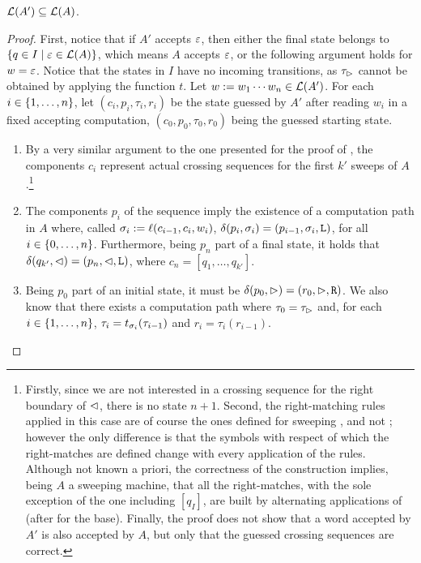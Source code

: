 \begin{lemm}\label{lem:swkLAtoNFA-2}
	$\mathcal L(A')\subseteq\mathcal L(A)$.
\end{lemm}
\begin{proof}
	First, notice that if $A'$ accepts $\varepsilon$, then either the final state belongs to $\{q\in I\mid \varepsilon\in\mathcal L(A)\}$, which means $A$ accepts $\varepsilon$, or the following argument holds for $w=\varepsilon$.
	Notice that the states in $I$ have no incoming transitions, as $\tau_\rhd$ cannot be obtained by applying the function $t$.
	Let $w:=w_1\cdots w_n\in\mathcal L(A')$. For each $i\in\{1,\dots,n\}$, let $(c_i,p_i,\tau_i,r_i)$ be the state guessed by $A'$ after reading $w_i$ in a fixed accepting computation, $(c_0,p_0,\tau_0,r_0)$ being the guessed starting state.
	\begin{enumerate}
		\item By a very similar argument to the one presented for the proof of , the components $c_i$ represent actual crossing sequences for the first $k'$ sweeps of $A$.\footnote{%
			      Firstly, since we are not interested in a crossing sequence for the right boundary of $\lhd$, there is no state $n+1$.
			      Second, the right-matching rules applied in this case are of course the ones defined for sweeping \kDLAs, and not \TDFAs; however the only difference is that the symbols with respect of which the right-matches are defined change with every application of the rules.
			      Although not known a priori, the correctness of the construction implies, being $A$ a sweeping machine, that all the right-matches, with the sole exception of the one including $[q_I]$, are built by alternating applications of  (after  for the base).
			      Finally, the proof does not show that a word accepted by $A'$ is also accepted by $A$, but only that the guessed crossing sequences are correct.}
		\item The components $p_i$ of the sequence imply the existence of a computation path in $A$ where, called $\sigma_i:=\ell(c_{i-1},c_i,w_i)$, $\delta(p_i,\sigma_i)=(p_{i-1},\sigma_i,\mathtt L)$, for all $i\in\{0,\dots,n\}$.
		      Furthermore, being $p_n$ part of a final state, it holds that $\delta(q_{k'},\lhd)=(p_n,\lhd,\mathtt L)$, where $c_n=[q_1,\dots,q_{k'}]$.
		\item Being $p_0$ part of an initial state, it must be $\delta(p_0,\rhd)=(r_0,\rhd,\mathtt R)$.
		      We also know that there exists a computation path where $\tau_0=\tau_\rhd$ and, for each $i\in\{1,\dots,n\}$, $\tau_i=t_{\sigma_i}(\tau_{i-1})$ and $r_i=\tau_i(r_{i-1})$.

\end{enumerate}
\end{proof}
